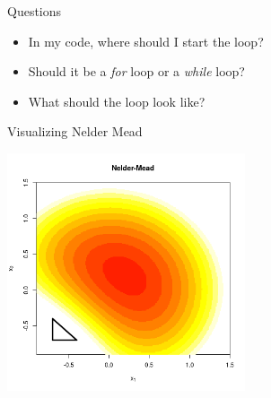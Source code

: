 \documentclass[10pt]{beamer}
\begin{document}
                                                                                              \begin{frame}{Questions}
                                                                                                \begin{itemize}
                                                                                                \item In my code, where should I start the loop?\\

                                                                                                \item Should it be a {\em for} loop or a {\em while} loop?

                                                                                                \item What should the loop look like?
                                                                                                \end{itemize}
                                                                                              \end{frame}
                                                                                              \begin{frame}{Visualizing Nelder Mead}
                                                                                                \begin{center}
                                                                                                  \includegraphics[height=7cm]{RCode/NM/out/out00}
                                                                                                \end{center}
                                                                                              \end{frame}
\end{document}
